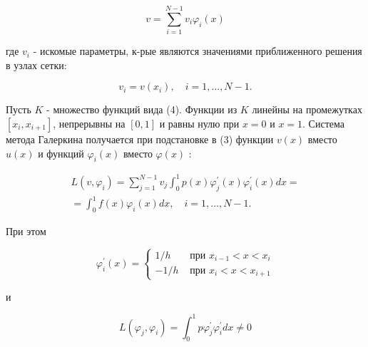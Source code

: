 \documentclass[10pt]{article}
\begin{document}
\[

v=\sum_{i=1}^{N-1} v_{i} \varphi_{i}(x)

\]



где $v_{i}$ - искомые параметры, к-рые являются значениями приближенного решения в узлах сетки:



\[

v_{i}=v\left(x_{i}\right), \quad i=1, \ldots, N-1 .

\]



Пусть $K$ - множество функций вида (4). Функции из $K$ линейны на промежутках $\left[x_{i}, x_{i+1}\right]$, непрерывны на $[0,1]$ и равны нулю при $x=0$ и $x=1$. Система метода Галеркина получается при подстановке в (3) функции $v(x)$ вместо $u(x)$ и функций $\varphi_{i}(x)$ вместо $\varphi(x)$ :



\[

\begin{gathered}

L\left(v, \varphi_{i}\right)=\sum_{j=1}^{N-1} v_{j} \int_{0}^{1} p(x) \varphi_{j}^{\prime}(x) \varphi_{i}^{\prime}(x) d x= \\

=\int_{0}^{1} f(x) \varphi_{i}(x) d x, \quad i=1, \ldots, N-1 .

\end{gathered}

\]



При этом



\[

\varphi_{i}^{\prime}(x)=\left\{\begin{aligned}

1 / h & \text { при } x_{i-1}<x<x_{i} \\

-1 / h & \text { при } x_{i}<x<x_{i+1}

\end{aligned}\right.

\]



и



\[

L\left(\varphi_{j}, \varphi_{i}\right)=\int_{0}^{1} p \varphi_{j}^{\prime} \varphi_{i}^{\prime} d x \neq 0

\]
\end{document}
